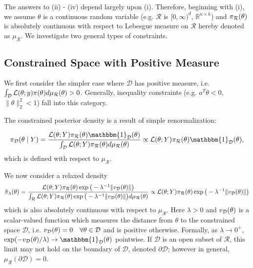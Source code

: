 \documentclass[10pt,fleqn]{article} \pdfoutput=1
\DeclareMathOperator{\1}{\mathbbm{1}} \DeclareMathOperator{\bigO}{\mc O}
\begin{document}
The answers to (ii) - (iv) depend largely upon (i).  Therefore, beginning
with (i), we assume $\theta$ is a continuous random variable (e.g.
$\mathcal{R}$ is $[0,\infty)^d$, $\mathbb{R}^{n\times k}$)
and  $\pi_{\mathcal{R}}(\theta)$ is absolutely continuous with respect to Lebesgue measure on
$\mathcal{R}$ hereby denoted as $\mu_\mathcal{R}$. We investigate two
general types of constraints.

\subsection{Constrained Space with Positive Measure}
\label{SEC:Positive_measure_methods}

We first consider the simpler case where $\mathcal{D}$ has positive measure,  i.e.
$\int_\mathcal{D} {\mathcal{L}}(\theta;y)\pi(\theta)d\mu_\mathcal{R}(\theta) >0$.
Generally, inequality constraints (e.g.  $a^T\theta
	< 0$, $\|\theta\|_2^2 < 1$) fall into this category.

The constrained posterior density is a result of simple
renormalization:

$$\pi_\mathcal{D}(\theta\mid Y) = \frac{\mathcal{L}(\theta; Y)
		\pi_\mathcal{R}(\theta)\mathbbm{1}_\mathcal{D}(\theta)}{\int_\mathcal{D}
		\mathcal{L}(\theta; Y)
		\pi_\mathcal{R}(\theta)d\mu_\mathcal{R}(\theta)}\propto \mathcal{L}(\theta;
	Y) \pi_\mathcal{R}(\theta)\mathbbm{1}_\mathcal{D}(\theta), $$
which is defined with respect to $\mu_\mathcal{R}$.

We now consider a relaxed density
\begin{equation}
	\label{EQ:relaxedDensityPosMeasure}
\tilde{\pi}_\lambda(\theta) =
	\frac{\mathcal{L}(\theta;
		Y)\pi_\mathcal{R}(\theta)\exp\big(-
			\lambda^{-1}{\|v_{\mathcal{D}}(\theta)\|}\big)}{\int_{\mathcal{R}}\mathcal{L}(\theta; Y)
					\pi_\mathcal{R}(\theta)\exp\big(-{\lambda^{-1}}{\|v_{\mathcal{D}}(\theta)\|}\big) d\mu_\mathcal{R}(\theta)} \propto
	\mathcal{L}(\theta; Y)
	\pi_\mathcal{R}(\theta)\exp\big(-{\lambda^{-1}}{\|v_{\mathcal{D}}(\theta)\|}\big)
				\end{equation}
which is also absolutely continuous
with respect to $\mu_\mathcal{R}.$ Here $\lambda >0$ and $v_{\mathcal{D}}(\theta)$ is a scalar-valued function which measures the distance
from $\theta$ to the constrained space $\mathcal{D}$, i.e.  $v_{\mathcal{D}}(\theta) = 0 \quad \forall \theta \in \mathcal{D}$ and is
positive otherwise.  Formally, as $\lambda \to 0^+$, $\exp(-v_{\mc
	D}(\theta)/\lambda) \to \mathbbm{1}_\mathcal{D}(\theta)$ pointwise.
If $\mathcal{D}$ is an open subset of $\mathcal{R}$, this limit may
not hold on the boundary of $\mathcal{D}$, denoted $\partial
	\mathcal{D}$; however in general, $\mu_\mathcal{R}(\partial
	\mathcal{D}) = 0$.
\end{document}
